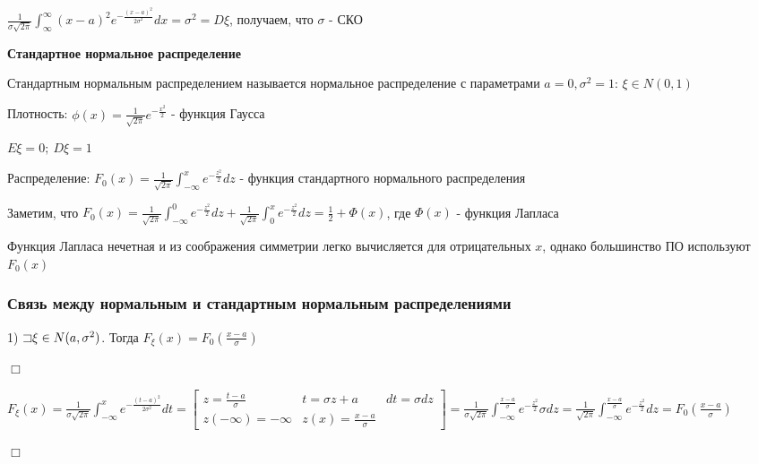 \documentclass[12pt]{article}
\begin{document}
    $\frac{1}{\sigma\sqrt{2\pi}} \int_{\infty}^\infty (x - a)^2 e^{-\frac{(x - a)^2}{2\sigma^2}} dx = \sigma^2 = D\xi$, получаем, что $\sigma$ - СКО

    \mediumvspace

    \textbf{Стандартное нормальное распределение}

    \Def Стандартным нормальным распределением называется нормальное распределение с параметрами $a = 0, \sigma^2 = 1$: $\xi \in N(0, 1)$

    Плотность: $\phi(x) = \frac{1}{\sqrt{2\pi}} e^{-\frac{x^2}{2}}$ - функция Гаусса

    $E\xi = 0; \ D\xi = 1$

    Распределение: $F_0(x) = \frac{1}{\sqrt{2\pi}} \int_{-\infty}^x e^{-\frac{z^2}{2}} dz$ - функция стандартного нормального распределения

    Заметим, что $F_0(x) = \frac{1}{\sqrt{2\pi}} \int_{-\infty}^0 e^{-\frac{z^2}{2}} dz + \frac{1}{\sqrt{2\pi}} \int_0^x e^{-\frac{z^2}{2}} dz = \frac{1}{2} + \Phi(x)$, где $\Phi(x)$ - функция Лапласа

    Функция Лапласа нечетная и из соображения симметрии легко вычисляется для отрицательных $x$, однако большинство ПО используют $F_0(x)$
    
    \subsubsection{Связь между нормальным и стандартным нормальным распределениями}

    1) $\mathord{\sqsupset} \xi \in N(a, \sigma^2)$. Тогда $F_\xi(x) = F_0\left(\frac{x - a}{\sigma}\right)$

    \begin{MyProof}
        $\Box$
        
        $F_\xi(x) = \frac{1}{\sigma\sqrt{2\pi}} \int_{-\infty}^x e^{-\frac{(t - a)^2}{2\sigma^2}} dt = \left[\begin{matrix}z = \frac{t - a}{\sigma} & t = \sigma z + a & dt = \sigma dz \\ z (-\infty) = -\infty & z(x) = \frac{x - a}{\sigma} & \end{matrix}\right] = 
        \frac{1}{\sigma\sqrt{2\pi}} \int_{-\infty}^\frac{x - a}{\sigma} e^{-\frac{z^2}{2}} \sigma dz = \frac{1}{\sqrt{2\pi}} \int_{-\infty}^\frac{x - a}{\sigma} e^{-\frac{z^2}{2}} dz = F_0\left(\frac{x - a}{\sigma}\right)$
        
        $\Box$
    \end{MyProof}
\end{document}
